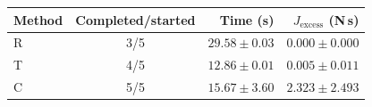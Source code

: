 \begin{tabular}{lcrr}
\toprule
Method & Completed/started & Time (s) & $J_{\mathrm{excess}}$ (N\,s) \\
\midrule
R & 3/5 & $29.58 \pm 0.03$ & $0.000 \pm 0.000$ \\
T & 4/5 & $12.86 \pm 0.01$ & $0.005 \pm 0.011$ \\
C & 5/5 & $15.67 \pm 3.60$ & $2.323 \pm 2.493$ \\
\bottomrule
\end{tabular}
